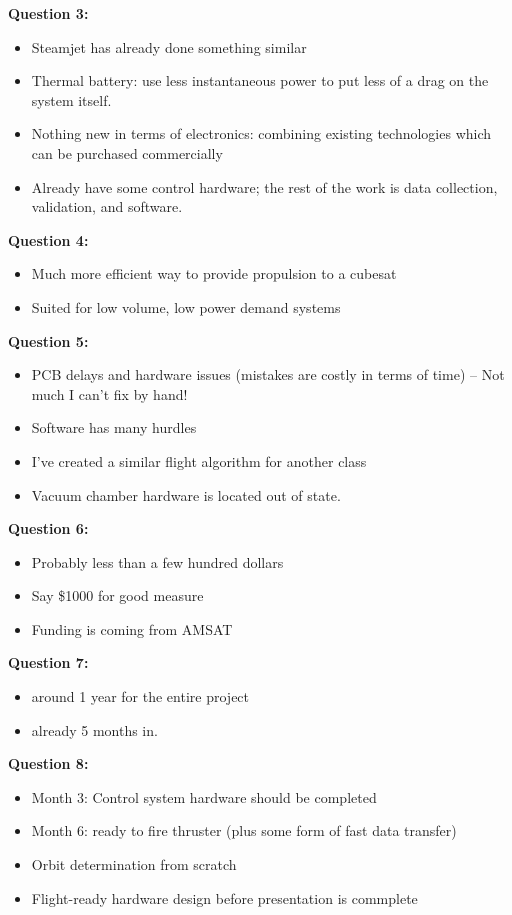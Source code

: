 \textbf{Question 3:}
\begin{itemize}
    \item Steamjet has already done something similar
    \item Thermal battery: use less instantaneous power to put less of a drag on the system itself.
    \item Nothing new in terms of electronics: combining existing technologies which can be purchased commercially
    \item Already have some control hardware; the rest of the work is data collection, validation, and software.
\end{itemize}

\textbf{Question 4:}
\begin{itemize}
    \item Much more efficient way to provide propulsion to a cubesat
    \item Suited for low volume, low power demand systems
\end{itemize}

\textbf{Question 5:}
\begin{itemize}
    \item PCB delays and hardware issues (mistakes are costly in terms of time) -- Not much I can't fix by hand!
    \item Software has many hurdles
    \item I've created a similar flight algorithm for another class
    \item Vacuum chamber hardware is located out of state.
\end{itemize}

\textbf{Question 6:}
\begin{itemize}
    \item Probably less than a few hundred dollars
    \item Say \$1000 for good measure
    \item Funding is coming from AMSAT
\end{itemize}

\textbf{Question 7:}
\begin{itemize}
    \item around 1 year for the entire project
    \item already 5 months in.
\end{itemize}

\textbf{Question 8:}
\begin{itemize}
    \item Month 3: Control system hardware should be completed
    \item Month 6: ready to fire thruster (plus some form of fast data transfer)
    \item Orbit determination from scratch
    \item Flight-ready hardware design before presentation is commplete
\end{itemize}

